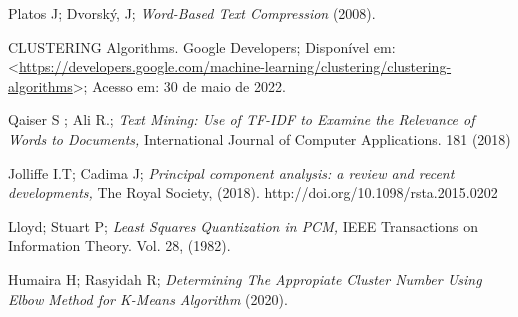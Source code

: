 \documentclass[
	12pt,					%
	openright,				%
	twoside,					%
	a4paper,					%
	english,					%
	brazil					%
	]{abntex2}
\begin{document}
\begin{thebibliography}{9}
 Platos J; Dvorský, J;
\emph{Word-Based Text Compression} (2008). 

CLUSTERING Algorithms.
Google Developers; 
Disponível em:  <\url{https://developers.google.com/machine-learning/clustering/clustering-algorithms}>; Acesso em: 30 de maio de 2022.

 Qaiser S ; Ali R.; 
\emph{Text Mining: Use of TF-IDF to Examine the Relevance of Words to Documents, } International Journal of Computer Applications. 181 (2018)

 Jolliffe I.T; Cadima J;
\emph{Principal component analysis: a review and recent developments, } The Royal Society, (2018).
http://doi.org/10.1098/rsta.2015.0202

 Lloyd; Stuart P;
\emph{Least Squares Quantization in PCM, } IEEE Transactions on Information Theory. Vol. 28, (1982).

 Humaira H; Rasyidah R;
\emph{Determining The Appropiate Cluster Number Using Elbow Method for K-Means Algorithm} (2020). 

 
\end{thebibliography}

	
% 

% 

\end{document}
